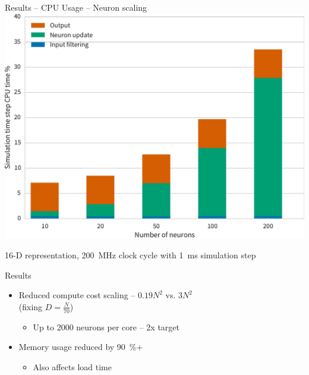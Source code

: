 \documentclass[t]{beamer}
\begin{document}
  \begin{frame}[plain]{Results -- CPU Usage -- Neuron scaling}
    \includegraphics[width=\textwidth]{figures/comm_channel_cpu_16d_bar.pdf}

    {\tiny 16-D representation, \SI{200}{\mega\hertz} clock cycle with
     \SI{1}{\milli\second} simulation step}
  \end{frame}

  \begin{frame}{Results}
    \begin{itemize}
      \item Reduced compute cost scaling -- $0.19N^2$ vs. $3N^2$\\
            (fixing $D = \frac{N}{70}$)
        \begin{itemize}
          \item Up to 2000 neurons per core -- 2x target
        \end{itemize}
      \item Memory usage reduced by \SI{90}{\percent}+
        \begin{itemize}
          \item Also affects load time
        \end{itemize}
    \end{itemize}
  \end{frame}
\end{document}
